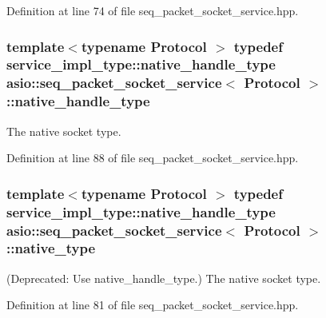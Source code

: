 Definition at line 74 of file seq\+\_\+packet\+\_\+socket\+\_\+service.\+hpp.

\hypertarget{classasio_1_1seq__packet__socket__service_a80d5af14e0e6580995b0a64de71f6f9a}{}
\subsubsection[{native\+\_\+handle\+\_\+type}]{\setlength{\rightskip}{0pt plus 5cm}template$<$typename Protocol $>$ typedef {\bf service\+\_\+impl\+\_\+type\+::native\+\_\+handle\+\_\+type} {\bf asio\+::seq\+\_\+packet\+\_\+socket\+\_\+service}$<$ Protocol $>$\+::{\bf native\+\_\+handle\+\_\+type}}\label{classasio_1_1seq__packet__socket__service_a80d5af14e0e6580995b0a64de71f6f9a}


The native socket type. 



Definition at line 88 of file seq\+\_\+packet\+\_\+socket\+\_\+service.\+hpp.

\hypertarget{classasio_1_1seq__packet__socket__service_a50a688faafd55ee40b087c28b398efc2}{}
\subsubsection[{native\+\_\+type}]{\setlength{\rightskip}{0pt plus 5cm}template$<$typename Protocol $>$ typedef {\bf service\+\_\+impl\+\_\+type\+::native\+\_\+handle\+\_\+type} {\bf asio\+::seq\+\_\+packet\+\_\+socket\+\_\+service}$<$ Protocol $>$\+::{\bf native\+\_\+type}}\label{classasio_1_1seq__packet__socket__service_a50a688faafd55ee40b087c28b398efc2}


(Deprecated\+: Use native\+\_\+handle\+\_\+type.) The native socket type. 



Definition at line 81 of file seq\+\_\+packet\+\_\+socket\+\_\+service.\+hpp.

\hypertarget{classasio_1_1seq__packet__socket__service_a34f0604b58ba016dc75d31f86d291458}{}
